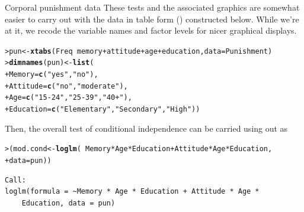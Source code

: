 \documentclass[10pt,krantz2]{krantz}\usepackage[]{graphicx}\usepackage[]{color}
\makeatletter
\newcommand{\hlstr}[1]{\textcolor[rgb]{0.192,0.494,0.8}{#1}}%
\newcommand{\hlopt}[1]{\textcolor[rgb]{0,0,0}{#1}}%
\newcommand{\hlstd}[1]{\textcolor[rgb]{0.345,0.345,0.345}{#1}}%
\newcommand{\hlkwb}[1]{\textcolor[rgb]{0.69,0.353,0.396}{#1}}%
\newcommand{\hlkwc}[1]{\textcolor[rgb]{0.333,0.667,0.333}{#1}}%
\newcommand{\hlkwd}[1]{\textcolor[rgb]{0.737,0.353,0.396}{\textbf{#1}}}%
\newenvironment{kframe}{%
 \def\at@end@of@kframe{}%
 \ifinner\ifhmode%
  \def\at@end@of@kframe{\end{minipage}}%
  \begin{minipage}{\columnwidth}%
 \fi\fi%
 \def\FrameCommand##1{\hskip\@totalleftmargin \hskip-\fboxsep
 \colorbox{shadecolor}{##1}\hskip-\fboxsep
     \hskip-\linewidth \hskip-\@totalleftmargin \hskip\columnwidth}%
 \MakeFramed {\advance\hsize-\width
   \@totalleftmargin\z@ \linewidth\hsize
   \@setminipage}}%
 {\par\unskip\endMakeFramed%
 \at@end@of@kframe}
\newenvironment{knitrout}{}{} %
\renewenvironment{knitrout}{\small\renewcommand{\baselinestretch}{.85}}{} %
\makeatother
\begin{document}
\begin{Example}[punish]{Corporal punishment data}
These tests and the associated graphics are somewhat easier to carry out with the data
in table form () constructed below.  While we're at it, we recode the
variable names and factor levels for nicer graphical displays.
\begin{knitrout}
\color{fgcolor}\begin{kframe}
\begin{alltt}
\hlstd{> }\hlstd{pun} \hlkwb{<-} \hlkwd{xtabs}\hlstd{(Freq} \hlopt{~} \hlstd{memory} \hlopt{+} \hlstd{attitude} \hlopt{+} \hlstd{age} \hlopt{+} \hlstd{education,} \hlkwc{data} \hlstd{= Punishment)}
\hlstd{> }\hlkwd{dimnames}\hlstd{(pun)} \hlkwb{<-} \hlkwd{list}\hlstd{(}
\hlstd{+ }  \hlkwc{Memory} \hlstd{=} \hlkwd{c}\hlstd{(}\hlstr{"yes"}\hlstd{,} \hlstr{"no"}\hlstd{),}
\hlstd{+ }  \hlkwc{Attitude} \hlstd{=} \hlkwd{c}\hlstd{(}\hlstr{"no"}\hlstd{,} \hlstr{"moderate"}\hlstd{),}
\hlstd{+ }  \hlkwc{Age} \hlstd{=} \hlkwd{c}\hlstd{(}\hlstr{"15-24"}\hlstd{,} \hlstr{"25-39"}\hlstd{,} \hlstr{"40+"}\hlstd{),}
\hlstd{+ }  \hlkwc{Education} \hlstd{=} \hlkwd{c}\hlstd{(}\hlstr{"Elementary"}\hlstd{,} \hlstr{"Secondary"}\hlstd{,} \hlstr{"High"}\hlstd{))}
\end{alltt}
\end{kframe}
\end{knitrout}

Then, the overall test of conditional independence can be carried using  out as
\begin{knitrout}
\color{fgcolor}\begin{kframe}
\begin{alltt}
\hlstd{> }\hlstd{(mod.cond} \hlkwb{<-} \hlkwd{loglm}\hlstd{(}\hlopt{~} \hlstd{Memory} \hlopt{*} \hlstd{Age} \hlopt{*} \hlstd{Education} \hlopt{+} \hlstd{Attitude} \hlopt{*} \hlstd{Age} \hlopt{*} \hlstd{Education,}
\hlstd{+ }                   \hlkwc{data} \hlstd{= pun))}
\end{alltt}
\begin{verbatim}
Call:
loglm(formula = ~Memory * Age * Education + Attitude * Age * 
    Education, data = pun)


\end{verbatim}
\end{kframe}
\end{knitrout}
\end{Example}
\end{document}
